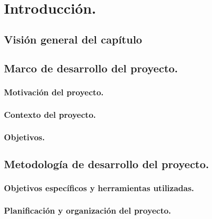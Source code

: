 \chapter{Introducción.}
\minitoc

\newpage
\section{Visión general del capítulo}

\section{Marco de desarrollo del proyecto.}

\subsection{Motivación del proyecto.}

\subsection{Contexto del proyecto.}

\subsection{Objetivos.}

\section{Metodología de desarrollo del proyecto.}

\subsection{Objetivos específicos y herramientas utilizadas.}

\subsection{Planificación y organización del proyecto.}


